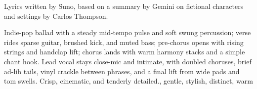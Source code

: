 

\begin{notes}
Lyrics written by Suno, based on a summary by Gemini on fictional characters and settings by Carlos Thompson.
\end{notes}

\begin{style}
Indie-pop ballad with a steady mid-tempo pulse and soft swung percussion; verse rides sparse guitar, brushed kick, and muted bass; pre-chorus opens with rising strings and handclap lift; chorus lands with warm harmony stacks and a simple chant hook. %
Lead vocal stays close-mic and intimate, with doubled choruses, brief ad-lib tails, vinyl crackle between phrases, and a final lift from wide pads and tom swells. %
Crisp, cinematic, and tenderly detailed., gentle, stylish, distinct, warm
\end{style}

